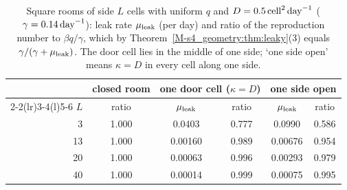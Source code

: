 \begin{table}[tbp]
  \centering
  \caption{Square rooms of side $L$ cells with uniform $q$ and $D=0.5\,\mathrm{cell}^2\,\mathrm{day}^{-1}$ ($\gamma=0.14\,\mathrm{day}^{-1}$): leak
  rate $\mu_{\mathrm{leak}}$ (per day) and ratio of the reproduction number to $\beta q/\gamma$, which by
  Theorem~\ref{M-s4_geometry:thm:leaky}(3) equals $\gamma/(\gamma+\mu_{\mathrm{leak}})$. The door cell lies in the middle of
  one side; `one side open' means $\kappa=D$ in every cell along one side.}
  \label{s4_geometry:tab:leak}
  \small
  \begin{tabular}{@{}rccccc@{}}
    \toprule
        & closed room & \multicolumn{2}{c}{one door cell ($\kappa=D$)} & \multicolumn{2}{c}{one side open} \\
    \cmidrule(lr){2-2}\cmidrule(lr){3-4}\cmidrule(l){5-6}
    $L$ & ratio & $\mu_{\mathrm{leak}}$ & ratio & $\mu_{\mathrm{leak}}$ & ratio \\
    \midrule
    3   & 1.000 & 0.0403  & 0.777 & 0.0990  & 0.586 \\
    13  & 1.000 & 0.00160 & 0.989 & 0.00676 & 0.954 \\
    20  & 1.000 & 0.00063 & 0.996 & 0.00293 & 0.979 \\
    40  & 1.000 & 0.00014 & 0.999 & 0.00075 & 0.995 \\
    \bottomrule
  \end{tabular}
\end{table}

